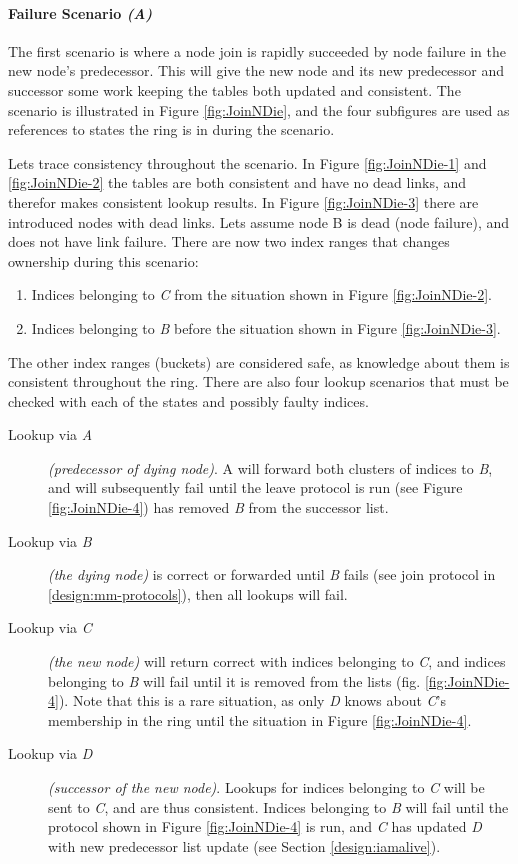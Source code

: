 \paragraph{Failure Scenario \emph{(A)}}
The first scenario is where a node join is rapidly succeeded by node failure in the new
 node's predecessor. This will give the new node and its new predecessor and successor
 some work keeping the tables both updated and consistent. The scenario is illustrated in
 Figure \ref{fig:JoinNDie}, and the four subfigures are used as references to states the
 ring is in during the scenario.

Lets trace consistency throughout the scenario. In Figure \ref{fig:JoinNDie-1} and
 \ref{fig:JoinNDie-2} the tables are both consistent and have no dead links, and therefor
 makes consistent lookup results. In Figure \ref{fig:JoinNDie-3} there are introduced nodes
 with dead links. Lets assume node B is dead (node failure), and does not have link failure.
 There are now two index ranges that changes ownership during this scenario:

\begin{enumerate}
\item Indices belonging to \emph{C} from the situation shown in Figure \ref{fig:JoinNDie-2}.
\item Indices belonging to \emph{B} before the situation shown in Figure \ref{fig:JoinNDie-3}.
\end{enumerate}

The other index ranges (buckets) are considered safe, as knowledge about them is
 consistent throughout the ring. There are also four lookup scenarios that must be
 checked with each of the states and possibly faulty indices.

\begin{description}
\item[Lookup via \emph{A}] {\em(predecessor of dying node)}.
  A will forward both clusters of indices to \emph{B}, and will subsequently fail until
  the leave protocol is run (see Figure \ref{fig:JoinNDie-4}) has removed \emph{B} from
  the successor list.
\item[Lookup via \emph{B}] {\em(the dying node)}
  is correct or forwarded until \emph{B} fails (see join protocol in \ref{design:mm-protocols}),
  then all lookups will fail.
\item[Lookup via \emph{C}] {\em(the new node)}
  will return correct with indices belonging to \emph{C}, and indices belonging to \emph{B} will fail
  until it is removed from the lists (fig. \ref{fig:JoinNDie-4}). Note that this is a
  rare situation, as only \emph{D} knows about \emph{C}'s membership in the ring until the
  situation in Figure \ref{fig:JoinNDie-4}.
\item[Lookup via \emph{D}] {\em(successor of the new node)}.
  Lookups for indices belonging to \emph{C} will be sent to \emph{C}, and are thus consistent. Indices
  belonging to \emph{B} will fail until the protocol shown in Figure \ref{fig:JoinNDie-4}
  is run, and \emph{C} has updated \emph{D} with new predecessor list update (see Section
  \ref{design:iamalive}).
\end{description}

